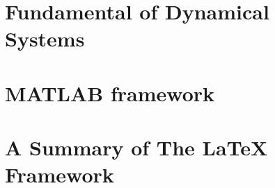 \documentclass[11pt, letterpaper, onecolumn, english, notitlepage]{book}
\begin{document}
    \newpage
    \chapter{Fundamental of Dynamical Systems} {
        \newpage
        
    }

    \newpage
    \chapter{MATLAB framework} {
        \newpage
        
    }

    \newpage
    \chapter{A Summary of The \LaTeX{} Framework} {
        \newpage

    }
\end{document}
